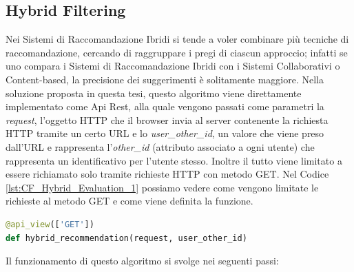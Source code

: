 \subsection{Hybrid Filtering} 
Nei Sistemi di Raccomandazione Ibridi si tende a voler combinare più tecniche di raccomandazione, cercando di raggruppare i 
pregi di ciascun approccio; infatti se uno compara i Sistemi di Raccomandazione Ibridi con i Sistemi Collaborativi o 
Content-based, la precisione dei suggerimenti è solitamente maggiore.\hfill\break
Nella soluzione proposta in questa tesi, questo algoritmo viene direttamente implementato come Api Rest, alla quale vengono 
passati come parametri la \textit{request}, l'oggetto HTTP che il browser invia al server contenente la richiesta HTTP tramite 
un certo URL e lo \textit{user\_other\_id}, un valore che viene preso dall'URL e rappresenta l'\textit{other\_id} (attributo 
associato a ogni utente) che rappresenta un identificativo per l'utente stesso. Inoltre il tutto viene limitato a essere richiamato 
solo tramite richieste HTTP con metodo GET.\hfill\break
Nel Codice \ref{lst:CF_Hybrid_Evaluation_1} possiamo vedere come vengono limitate le richieste al metodo GET e come 
viene definita la funzione.
\begin{lstlisting}[language=Python, label=lst:CF_Hybrid_Evaluation_1, caption={\ }]
@api_view(['GET'])
def hybrid_recommendation(request, user_other_id)
\end{lstlisting} 
%
Il funzionamento di questo algoritmo si svolge nei seguenti passi:
